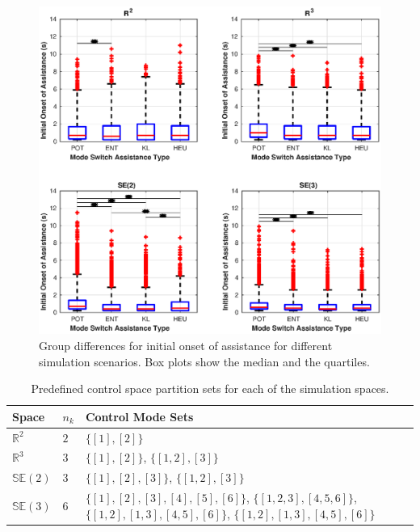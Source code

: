 \documentclass[conference]{IEEEtran}
\begin{document}
 \begin{figure}[t!]
	\centering
	\includegraphics[width= 1.\hsize, height=0.45\vsize]{./figures/initial_alpha.eps}
	\vspace{-0.75cm}
	\caption{Group differences for initial onset of assistance for different simulation scenarios. Box plots show the median and the quartiles.} 
	\label{fig:initial_alpha}
\end{figure}

\begin{table}[t]
	\centering
	\begin{tabular}{|p{1cm}|p{0.5cm}|p{3cm}|}
		\hline
		\textbf{Space} & $n_k$ &\textbf{Control Mode Sets}  \\ \hline
		$\mathbb{R}^2$ & $2$ & $\{[1],[2]\}$ \\ \hline
		$\mathbb{R}^3$ & $3$ & $\{[1],[2]\}$, $\{[1,2], [3]\}$ \\ \hline
		$\mathbb{SE}(2)$ & $3$ &  $\{[1],[2],[3]\}$, $\{[1,2], [3]\}$ \\ \hline
		$\mathbb{SE}(3)$ & $6$ & $\{[1],[2],[3],[4],[5],[6]\}$, $\{[1,2,3],  [4,5,6]\}$, $\{[1,2], [1,3], [4,5], [6]\}$, $\{[1,2], [1,3], [4,5], [6]\}$ \\ \hline
	\end{tabular}
	\vspace{.2cm}
	\caption{Predefined control space partition sets for each of the simulation spaces.} 
	\label{tbl:cmp}
	\vspace{-.5cm}
\end{table}
\end{document}
